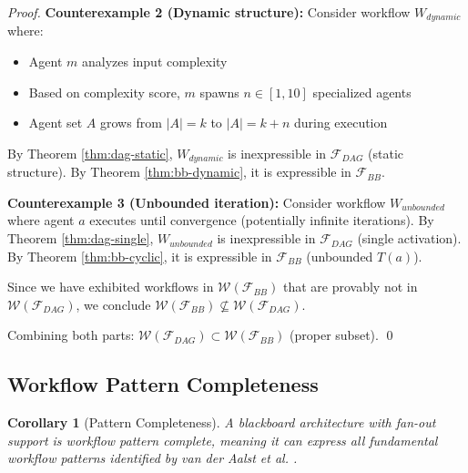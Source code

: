 \documentclass[11pt]{article}
\newtheorem{corollary}[theorem]{Corollary}
\begin{document}
\begin{proof}
\textbf{Counterexample 2 (Dynamic structure):} Consider workflow $W_{dynamic}$ where:
\begin{itemize}
    \item Agent $m$ analyzes input complexity
    \item Based on complexity score, $m$ spawns $n \in [1, 10]$ specialized agents
    \item Agent set $A$ grows from $|A| = k$ to $|A| = k + n$ during execution
\end{itemize}

By Theorem \ref{thm:dag-static}, $W_{dynamic}$ is inexpressible in $\mathcal{F}_{DAG}$ (static structure). By Theorem \ref{thm:bb-dynamic}, it is expressible in $\mathcal{F}_{BB}$.

\textbf{Counterexample 3 (Unbounded iteration):} Consider workflow $W_{unbounded}$ where agent $a$ executes until convergence (potentially infinite iterations). By Theorem \ref{thm:dag-single}, $W_{unbounded}$ is inexpressible in $\mathcal{F}_{DAG}$ (single activation). By Theorem \ref{thm:bb-cyclic}, it is expressible in $\mathcal{F}_{BB}$ (unbounded $T(a)$).

Since we have exhibited workflows in $\mathcal{W}(\mathcal{F}_{BB})$ that are provably not in $\mathcal{W}(\mathcal{F}_{DAG})$, we conclude $\mathcal{W}(\mathcal{F}_{BB}) \not\subseteq \mathcal{W}(\mathcal{F}_{DAG})$.

Combining both parts: $\mathcal{W}(\mathcal{F}_{DAG}) \subset \mathcal{W}(\mathcal{F}_{BB})$ (proper subset). \qed
\end{proof}

\subsection{Workflow Pattern Completeness}

\begin{corollary}[Pattern Completeness]
A blackboard architecture with fan-out support is \emph{workflow pattern complete}, meaning it can express all fundamental workflow patterns identified by van der Aalst et al. \cite{vanderaalst2003workflow}.
\end{corollary}
\end{document}
